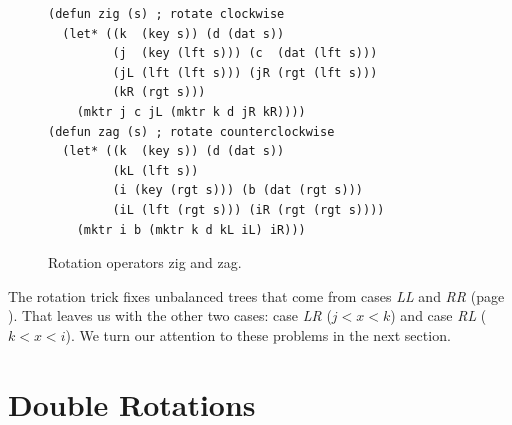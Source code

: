 \begin{figure}
\begin{center}
\begin{code}
\begin{verbatim}
(defun zig (s) ; rotate clockwise
  (let* ((k  (key s)) (d (dat s))
         (j  (key (lft s))) (c  (dat (lft s)))
         (jL (lft (lft s))) (jR (rgt (lft s)))
         (kR (rgt s)))
    (mktr j c jL (mktr k d jR kR))))
(defun zag (s) ; rotate counterclockwise
  (let* ((k  (key s)) (d (dat s))
         (kL (lft s))
         (i (key (rgt s))) (b (dat (rgt s)))
         (iL (lft (rgt s))) (iR (rgt (rgt s))))
    (mktr i b (mktr k d kL iL) iR)))
\end{verbatim}
\end{code}
\end{center}
\caption{Rotation operators \textsf{zig} and \textsf{zag}.}
\label{defun:zig-and-zag}
\end{figure}

The rotation trick fixes unbalanced trees that come
from cases \emph{LL} and \emph{RR} (page \pageref{cases:ht-n+2}).
That leaves us with the other two cases:
case \emph{LR} ($j < x < k$) and
case \emph{RL} ($k < x < i$).
We turn our attention to these problems in the next section.

\begin{exercises}
\end{exercises}

\section{Double Rotations}

